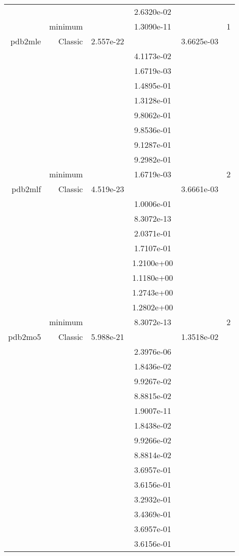 \begin{xltabular}{\textwidth}{r|rS[table-format=1.3e+2]S[table-format=1.4e+2]S[table-format=1.4e+2]S[table-format=-1.5]}
&  &  & 2.6320e-02 & & \\
& minimum &  & 1.3090e-11 & & 1 \\  \addlinespace
pdb2mle & Classic & 2.557e-22 &  & 3.6625e-03 & \\
&  &  & 4.1173e-02 & & \\
&  &  & 1.6719e-03 & & \\
&  &  & 1.4895e-01 & & \\
&  &  & 1.3128e-01 & & \\
&  &  & 9.8062e-01 & & \\
&  &  & 9.8536e-01 & & \\
&  &  & 9.1287e-01 & & \\
&  &  & 9.2982e-01 & & \\
& minimum &  & 1.6719e-03 & & 2 \\  \addlinespace
pdb2mlf & Classic & 4.519e-23 &  & 3.6661e-03 & \\
&  &  & 1.0006e-01 & & \\
&  &  & 8.3072e-13 & & \\
&  &  & 2.0371e-01 & & \\
&  &  & 1.7107e-01 & & \\
&  &  & 1.2100e+00 & & \\
&  &  & 1.1180e+00 & & \\
&  &  & 1.2743e+00 & & \\
&  &  & 1.2802e+00 & & \\
& minimum &  & 8.3072e-13 & & 2 \\  \addlinespace
pdb2mo5 & Classic & 5.988e-21 &  & 1.3518e-02 & \\
&  &  & 2.3976e-06 & & \\
&  &  & 1.8436e-02 & & \\
&  &  & 9.9267e-02 & & \\
&  &  & 8.8815e-02 & & \\
&  &  & 1.9007e-11 & & \\
&  &  & 1.8438e-02 & & \\
&  &  & 9.9266e-02 & & \\
&  &  & 8.8814e-02 & & \\
&  &  & 3.6957e-01 & & \\
&  &  & 3.6156e-01 & & \\
&  &  & 3.2932e-01 & & \\
&  &  & 3.4369e-01 & & \\
&  &  & 3.6957e-01 & & \\
&  &  & 3.6156e-01 & & \\

\end{xltabular}
